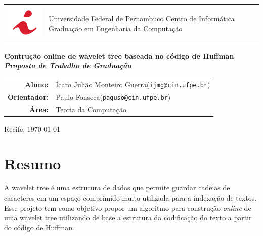 \documentclass[12pt, a4paper, oneside]{article}
\makeatletter
\newcommand{\thetitle}{Contrução online de wavelet tree baseada no código de Huffman}
\newcommand{\workarea}{Teoria da Computação}
\newcommand{\major}{Engenharia da Computação}
\newcommand{\studenttitle}{Aluno}
\newcommand{\student}{Ícaro Julião Monteiro Guerra}
\newcommand{\studentemail}{ijmg@cin.ufpe.br}
\newcommand{\advisertitle}{Orientador}
\newcommand{\adviser}{Paulo Fonseca}
\newcommand{\adviseremail}{paguso@cin.ufpe.br}
\makeatother
\begin{document}


{\Large
\thispagestyle{empty}
\begin{center}
\begin{tabular}{l p{10cm}}
	\includegraphics[width=3cm]{cin-logo.png} &
	\vspace{-25mm}
	Universidade Federal de Pernambuco\newline
	Centro de Informática\newline
	Graduação em \major
\end{tabular}

\vfill

{\huge \bfseries \thetitle}
\\
\medskip
{\bfseries\itshape Proposta de Trabalho de Graduação}

\vfill

\bigskip

	\begin{tabular}{r p{95mm}}
	\textbf{\studenttitle: } & \student \newline(\texttt{\studentemail}) \\ 
\textbf{\advisertitle: } & \adviser \newline(\texttt{\adviseremail})
\\
	\textbf{Área: } & \workarea 
\end{tabular}

	\vspace{3cm}
Recife, \today 
{}
\end{center}
}

\normalfont

\clearpage
\setcounter{page}{1}
\section*{Resumo}

A wavelet tree é uma estrutura de dados que permite guardar cadeias de caracteres em um espaço comprimido muito utilizada para a indexação de textos. Esse projeto tem como objetivo propor um algoritmo para construção \emph{online} de uma wavelet tree utilizando de base a estrutura da codificação do texto a partir do código de Huffman.
\end{document}
